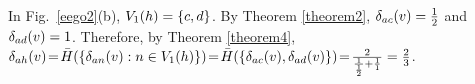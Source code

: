 \begin{example}
In Fig.~\ref{eego2}(b), %
$\V{h}{1} = \{c,d\}$.
By Theorem \ref{theorem2}, $\D{a}{c}{v}=\frac{1}{2}$ and $\D{a}{d}{v}=1$.
Therefore, by Theorem \ref{theorem4}, $\D{a}{h}{v}\!=\!\bar{H}(\{\D{a}{n}{v} : n \in \V{h}{1}\})\!=\!\bar{H}(\{\D{a}{c}{v},\D{a}{d}{v}\})\!=\!\frac{2}{\frac{1}{\frac{1}{2}} + \frac{1}{1}}=\frac{2}{3}$.  
\end{example}
